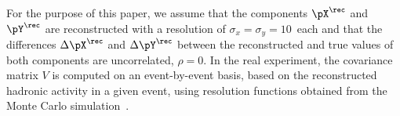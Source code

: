 For the purpose of this paper,
we assume that the components $\pX^{\rec}$ and $\pY^{\rec}$ are reconstructed with a resolution of $\sigma_{x} = \sigma_{y} = 10$~\GeV each
and that the differences $\Delta\pX^{\rec}$ and $\Delta\pY^{\rec}$ 
between the reconstructed and true values of both components are uncorrelated, \ie $\rho = 0$.
In the real experiment, the covariance matrix $V$ is computed on an
event-by-event basis, based on the reconstructed hadronic activity in a given event,
using resolution functions obtained from the Monte Carlo simulation~\cite{CMS-JME-13-003,CMS-JME-10-009}.
